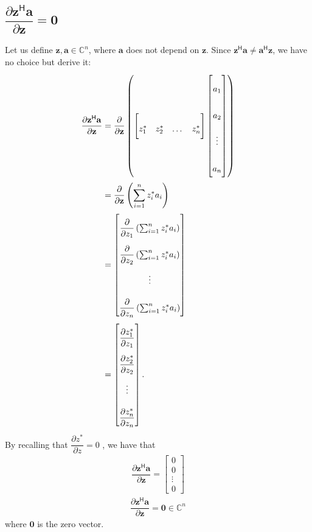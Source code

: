 \documentclass{article}
\newcommand{\hermit}{\mathsf{H}}
\begin{document}
\subsection{\(\dfrac{\partial \mathbf{z}^\hermit \mathbf{a}}{\partial \mathbf{z}} = \mathbf{0}\)}
Let us define \(\mathbf{z}, \mathbf{a} \in \mathbb{C}^{n}\), where \(\mathbf{a}\) does not depend on \(\mathbf{z}\). Since \(\mathbf{z}^\hermit \mathbf{a} \neq \mathbf{a}^\hermit \mathbf{z}\), we have no choice but derive it:
\begin{align}
    \dfrac{\partial \mathbf{z}^\hermit \mathbf{a}}{\partial\mathbf{z}} & = \dfrac{\partial}{\partial\mathbf{z}} \left(
    \begin{bmatrix}
        z^*_1 & z^*_2 & \dots & z^*_n
    \end{bmatrix} \begin{bmatrix}
        a_{1} \\ a_{2} \\ \vdots \\ a_{n}
    \end{bmatrix} \right) \\
    & = \dfrac{\partial}{\partial\mathbf{z}} \left( \sum_{i = 1}^n z^*_ia_i \right) \\
    &= \begin{bmatrix}
            \dfrac{\partial}{\partial z_1} \left( \sum_{i = 1}^n z^*_ia_i \right) \\ \dfrac{\partial}{\partial z_2} \left( \sum_{i = 1}^n z^*_ia_i \right) \\ \vdots \\
            \dfrac{\partial}{\partial z_n} \left( \sum_{i = 1}^n z^*_ia_i \right)
        \end{bmatrix} \\
    & = \renewcommand{\arraystretch}{2.6}\begin{bmatrix}
        \dfrac{\partial z_1^*}{\partial z_1} \\ \dfrac{\partial z_2^*}{\partial z_2} \\ \vdots \\
        \dfrac{\partial z_n^*}{\partial z_n}
    \end{bmatrix}.
\end{align}
By recalling that \(\dfrac{\partial z^*}{\partial z} = 0\) \cite{hjorungnes2011complex}, we have that
\begin{align}
    \dfrac{\partial \mathbf{z}^\hermit \mathbf{a}}{\partial\mathbf{z}} = \begin{bmatrix}
        0 \\ 0 \\ \vdots \\ 0
    \end{bmatrix}
\end{align}
\begin{align}
    \boxed{\dfrac{\partial \mathbf{z}^\hermit \mathbf{a}}{\partial\mathbf{z}} = \mathbf{0} \in \mathbb{C}^{n}}
\end{align}
where \(\mathbf{0}\) is the zero vector.
\end{document}
